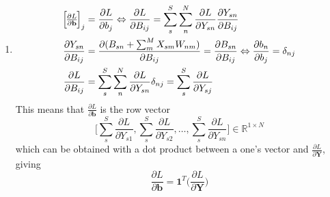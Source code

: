 \documentclass[11pt]{article}
\begin{document}
\begin{enumerate}[label=1\alph*]
\item
  \begin{align*}
    \Big{[\frac{\partial L}{\partial \mathbf{b}}\Big]}_{j} &=
                                               \frac{\partial
                                               L}{\partial
                                               b_{j}}
                                               \Leftrightarrow
                                               \frac{\partial
                                               L}{\partial
                                               B_{ij}} =
                                               \sum_s^S
                                               \sum_n^N
                                               \frac{\partial
                                               L}{\partial
                                               Y_{sn}}\frac{\partial
                                               Y_{sn}}{\partial
                                               B_{ij}} \\
    \frac{\partial Y_{sn}}{\partial B_{ij}} &= \frac{\partial
                                {(B_{sn}+\sum_{m}^{M}X_{sm}W_{nm})}}{\partial
                                B_{ij}} = \frac{\partial
                                B_{sn}}{\partial B_{ij}}
                                \Leftrightarrow
                                \frac{\partial b_n}{\partial
                                b_j} = \delta_{nj} \\
    \frac{\partial L}{\partial B_{ij}} &= \sum_s^S \sum_n^N \frac{\partial
                           L}{\partial Y_{sn}}\delta_{nj} =
                           \sum_s^S\frac{\partial
                           L}{\partial Y_{sj}}
  \end{align*}
  This means that $\frac{\partial L}{\partial \mathbf{b}}$ is the row
  vector
  \[
    {\Big[\sum_s^S\frac{\partial L}{\partial Y_{s1}},
      \sum_s^S\frac{\partial L}{\partial Y_{s2}}, \ldots,
      \sum_s^S\frac{\partial L}{\partial Y_{sn}} \Big]} \in
    \mathbb{R}^{1\times N}
  \]
  which can be obtained with a dot
  product between a one's vector and $\frac{\partial L}{\partial
    \mathbf{Y}}$, giving
  \[
    \frac{\partial L}{\partial
      \mathbf{b}}=\mathbf{1}^T{\Big(\frac{\partial L}{\partial
        \mathbf{Y}}\Big)}
  \]


\end{enumerate}
\end{document}
